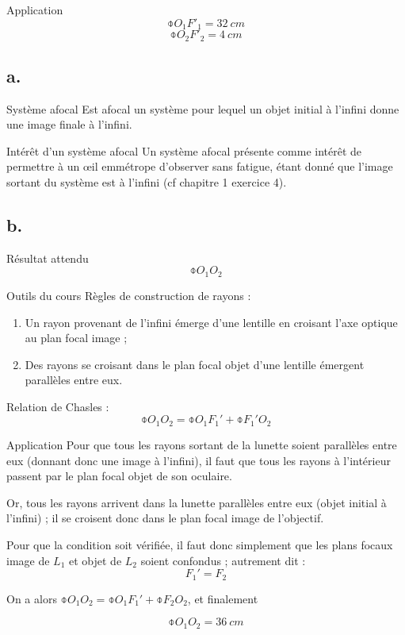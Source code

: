 \documentclass[10pt,notitlepage]{book}
\begin{document}
\begin{NCexem}{Application}
    \[ \boxed{\obar{O_1F'_1} = \SI{32}{cm}} \]
    \[ \boxed{\obar{O_2F'_2} = \SI{4}{cm}} \]
\end{NCexem}

\subsection{a.}
\begin{defi}{Système afocal}
    Est afocal un système pour lequel un objet initial à l'infini donne une
    image finale à l'infini.
\end{defi}

\begin{inte}{Intérêt d'un système afocal}
    Un système afocal présente comme intérêt de permettre à un œil emmétrope
    d'observer sans fatigue, étant donné que l'image sortant du système est à
    l'infini (cf chapitre 1 exercice 4).
\end{inte}

\setcounter{subsection}{1}
\subsection{b.}
\begin{NCprop}{Résultat attendu}
    $$\obar{O_1O_2}$$
\end{NCprop}

\begin{NCdemo}{Outils du cours}
    Règles de construction de rayons :
    \begin{enumerate}

        \item Un rayon provenant de l'infini émerge d'une lentille en croisant
            l'axe optique au plan focal image ;

        \item Des rayons se croisant dans le plan focal objet d'une lentille
            émergent parallèles entre eux.
    \end{enumerate}
    Relation de Chasles :
    \[ \obar{O_1O_2} = \obar{O_1F_1'} + \obar{F_1'O_2} \]
\end{NCdemo}

\begin{NCexem}{Application}
    Pour que tous les rayons sortant de la lunette soient parallèles entre eux
    (donnant donc une image à l'infini), il faut que tous les rayons à
    l'intérieur passent par le plan focal objet de son oculaire.\bigbreak

    Or, tous les rayons arrivent dans la lunette parallèles entre eux (objet
    initial à l'infini) ; il se croisent donc dans le plan focal image de
    l'objectif. \bigbreak

    Pour que la condition soit vérifiée, il faut donc simplement que les plans
    focaux image de $L_1$ et objet de $L_2$ soient confondus ; autrement dit :
    \[ \boxed{F_1' = F_2} \]
    
    On a alors $\obar{O_1O_2} = \obar{O_1F_1'} + \obar{F_2O_2}$, et finalement

    \[ \boxed{\obar{O_1O_2} = \SI{+36}{cm}} \]
\end{NCexem}
\end{document}
